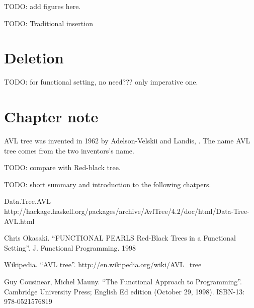 \documentclass{article}
\begin{document}
TODO: add figures here.

TODO:
  Traditional insertion
 

\section{Deletion}

  TODO: for functional setting, no need??? only imperative one.


\section{Chapter note}
AVL tree was invented in 1962 by Adelson-Velskii and Landis\cite{wiki}, 
\cite{TFATP}. The name AVL tree comes from the two inventors's name.

TODO: compare with Red-black tree.

  TODO: short summary and introduction to the following chatpers.

\begin{thebibliography}{99}

Data.Tree.AVL http://hackage.haskell.org/packages/archive/AvlTree/4.2/doc/html/Data-Tree-AVL.html

Chris Okasaki. ``FUNCTIONAL PEARLS Red-Black Trees in a Functional Setting''. J. Functional Programming. 1998

Wikipedia. ``AVL tree''. http://en.wikipedia.org/wiki/AVL\_tree

Guy Cousinear, Michel Mauny. ``The Functional Approach to Programming''. Cambridge University Press; English Ed edition (October 29, 1998). ISBN-13: 978-0521576819

\end{thebibliography}

\ifx\wholebook\relax\else
\end{document}
